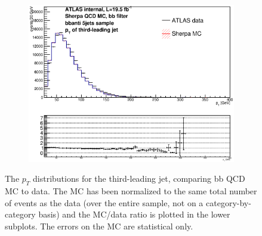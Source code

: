 \begin{figure}[phtb!]
\begin{center}
  \begin{subfigure}[$bbanti$ 5+ jet category]{0.3\textwidth}\includegraphics[width=\textwidth]{MonteCarlo/figures/pt2_bbanti_5jets.eps}\end{subfigure}
  \caption{The $p_T$ distributions for the third-leading jet, comparing bb QCD MC to data.  The MC has been normalized
  to the same total number of events as the data (over the entire sample, not on a category-by-category basis)
  and the MC/data ratio is plotted in the lower subplots.  The errors on the MC are statistical only.
  \label{fig:bb_qcd_mc_pt2}}
    \end{center}
\end{figure}



